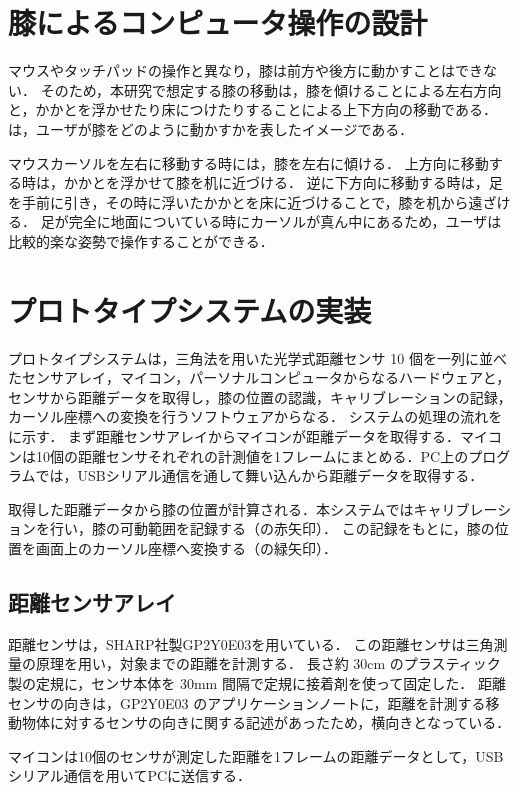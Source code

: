 \documentclass[submit, techrep]{ipsj}
\begin{document}
\section{膝によるコンピュータ操作の設計}
マウスやタッチパッドの操作と異なり，膝は前方や後方に動かすことはできない．
そのため，本研究で想定する膝の移動は，膝を傾けることによる左右方向と，かかとを浮かせたり床につけたりすることによる上下方向の移動である．
は，ユーザが膝をどのように動かすかを表したイメージである．

マウスカーソルを左右に移動する時には，膝を左右に傾ける．
上方向に移動する時は，かかとを浮かせて膝を机に近づける．
逆に下方向に移動する時は，足を手前に引き，その時に浮いたかかとを床に近づけることで，膝を机から遠ざける．
足が完全に地面についている時にカーソルが真ん中にあるため，ユーザは比較的楽な姿勢で操作することができる．

\section{プロトタイプシステムの実装}
プロトタイプシステムは，三角法を用いた光学式距離センサ 10 個を一列に並べたセンサアレイ，マイコン，パーソナルコンピュータからなるハードウェアと，センサから距離データを取得し，膝の位置の認識，キャリブレーションの記録，カーソル座標への変換を行うソフトウェアからなる．
システムの処理の流れをに示す．
まず距離センサアレイからマイコンが距離データを取得する．マイコンは10個の距離センサそれぞれの計測値を1フレームにまとめる．PC上のプログラムでは，USBシリアル通信を通して舞い込んから距離データを取得する．\par
取得した距離データから膝の位置が計算される．本システムではキャリブレーションを行い，膝の可動範囲を記録する（の赤矢印）．
この記録をもとに，膝の位置を画面上のカーソル座標へ変換する（の緑矢印）．


\subsection{距離センサアレイ}
距離センサは，SHARP社製GP2Y0E03を用いている．
この距離センサは三角測量の原理を用い，対象までの距離を計測する．
長さ約 30cm のプラスティック製の定規に，センサ本体を 30mm 間隔で定規に接着剤を使って固定した．
距離センサの向きは，GP2Y0E03 のアプリケーションノートに，距離を計測する移動物体に対するセンサの向きに関する記述があったため，横向きとなっている．\par
マイコンは10個のセンサが測定した距離を1フレームの距離データとして，USBシリアル通信を用いてPCに送信する．
\end{document}
